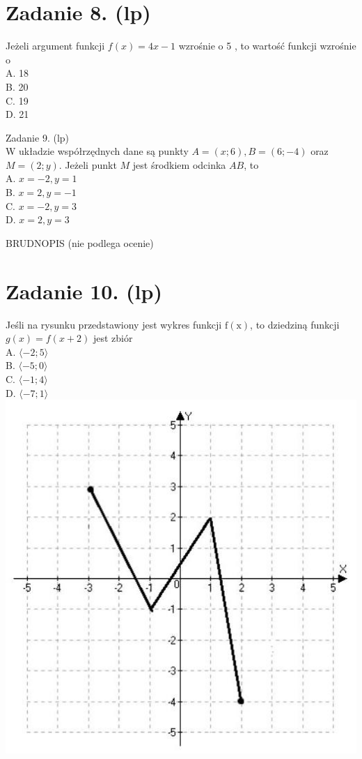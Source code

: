\documentclass[10pt]{article}
\begin{document}
\section*{Zadanie 8. (lp)}
Jeżeli argument funkcji \(f(x)=4 x-1\) wzrośnie o 5 , to wartość funkcji wzrośnie o\\
A. 18\\
B. 20\\
C. 19\\
D. 21

Zadanie 9. (lp)\\
W układzie współrzędnych dane są punkty \(A=(x ; 6), B=(6 ;-4)\) oraz \(M=(2 ; y)\). Jeżeli punkt \(M\) jest środkiem odcinka \(A B\), to\\
A. \(x=-2, y=1\)\\
B. \(x=2, y=-1\)\\
C. \(x=-2, y=3\)\\
D. \(x=2, y=3\)

BRUDNOPIS (nie podlega ocenie)

\section*{Zadanie 10. (lp)}
Jeśli na rysunku przedstawiony jest wykres funkcji \(\mathrm{f}(\mathrm{x})\), to dziedziną funkcji \(g(x)=f(x+2)\) jest zbiór\\
A. \(\langle-2 ; 5\rangle\)\\
B. \(\langle-5 ; 0\rangle\)\\
C. \(\langle-1 ; 4\rangle\)\\
D. \(\langle-7 ; 1\rangle\)\\
\includegraphics[max width=\textwidth, center]{2024_11_21_92d5a9232f32cac9f1a4g-04}
\end{document}
